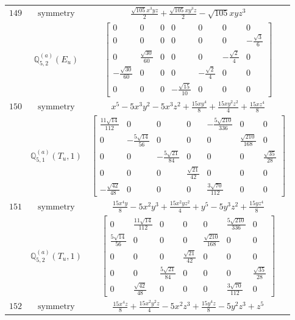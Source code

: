 \documentclass[fleqn,8pt,landscape]{jsarticle}
\begin{document}
\begin{longtable}{ccc}
$ 149 $ & $ \text{symmetry} $ & $ \frac{\sqrt{105} x^{3} y z}{2} + \frac{\sqrt{105} x y^{3} z}{2} - \sqrt{105} x y z^{3} $ \\
$  $ & $ \mathbb{Q}_{5,2}^{(a)}(E_{u}) $ & $ \begin{bmatrix} 0 & 0 & 0 & 0 & 0 & 0 & 0 \\ 0 & 0 & 0 & 0 & 0 & 0 & - \frac{\sqrt{3}}{6} \\ 0 & \frac{\sqrt{30}}{60} & 0 & 0 & 0 & - \frac{\sqrt{2}}{4} & 0 \\ - \frac{\sqrt{30}}{60} & 0 & 0 & 0 & - \frac{\sqrt{2}}{4} & 0 & 0 \\ 0 & 0 & 0 & - \frac{\sqrt{15}}{10} & 0 & 0 & 0 \end{bmatrix} $ \\ \hline
$ 150 $ & $ \text{symmetry} $ & $ x^{5} - 5 x^{3} y^{2} - 5 x^{3} z^{2} + \frac{15 x y^{4}}{8} + \frac{15 x y^{2} z^{2}}{4} + \frac{15 x z^{4}}{8} $ \\
$  $ & $ \mathbb{Q}_{5,1}^{(a)}(T_{u},1) $ & $ \begin{bmatrix} \frac{11 \sqrt{14}}{112} & 0 & 0 & 0 & - \frac{5 \sqrt{210}}{336} & 0 & 0 \\ 0 & - \frac{5 \sqrt{14}}{56} & 0 & 0 & 0 & \frac{\sqrt{210}}{168} & 0 \\ 0 & 0 & - \frac{5 \sqrt{21}}{84} & 0 & 0 & 0 & \frac{\sqrt{35}}{28} \\ 0 & 0 & 0 & \frac{\sqrt{21}}{42} & 0 & 0 & 0 \\ - \frac{\sqrt{42}}{48} & 0 & 0 & 0 & \frac{3 \sqrt{70}}{112} & 0 & 0 \end{bmatrix} $ \\ \hline
$ 151 $ & $ \text{symmetry} $ & $ \frac{15 x^{4} y}{8} - 5 x^{2} y^{3} + \frac{15 x^{2} y z^{2}}{4} + y^{5} - 5 y^{3} z^{2} + \frac{15 y z^{4}}{8} $ \\
$  $ & $ \mathbb{Q}_{5,2}^{(a)}(T_{u},1) $ & $ \begin{bmatrix} 0 & \frac{11 \sqrt{14}}{112} & 0 & 0 & 0 & \frac{5 \sqrt{210}}{336} & 0 \\ \frac{5 \sqrt{14}}{56} & 0 & 0 & 0 & \frac{\sqrt{210}}{168} & 0 & 0 \\ 0 & 0 & 0 & \frac{\sqrt{21}}{42} & 0 & 0 & 0 \\ 0 & 0 & \frac{5 \sqrt{21}}{84} & 0 & 0 & 0 & \frac{\sqrt{35}}{28} \\ 0 & \frac{\sqrt{42}}{48} & 0 & 0 & 0 & \frac{3 \sqrt{70}}{112} & 0 \end{bmatrix} $ \\ \hline
$ 152 $ & $ \text{symmetry} $ & $ \frac{15 x^{4} z}{8} + \frac{15 x^{2} y^{2} z}{4} - 5 x^{2} z^{3} + \frac{15 y^{4} z}{8} - 5 y^{2} z^{3} + z^{5} $ \\

\end{longtable}
\end{document}
